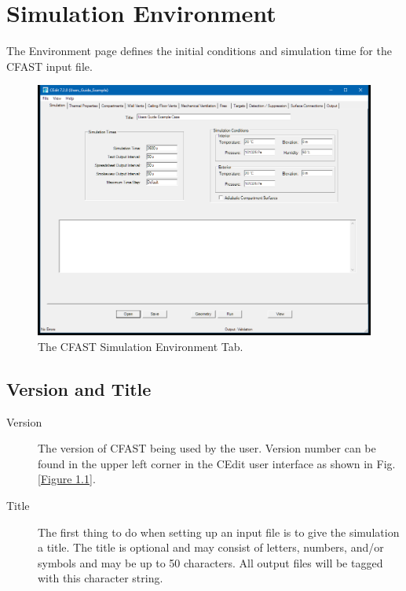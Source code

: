 \chapter{Simulation Environment}

The Environment page defines the initial conditions and simulation time for the CFAST input file.

\begin{figure}[ht]
\centering
\includegraphics[width=6.5in]{FIGURES/Environment_Tab}
\caption[The CFAST Simulation Environment Tab]{The CFAST Simulation Environment Tab.}
\end{figure}

\section{Version and Title}
\label{info:HEAD}

\begin{description}
\item[Version] The version of CFAST being used by the user. Version number can be found in the upper left corner in the CEdit user interface as shown in Fig. \ref{Figure 1.1}.

\item[Title] The first thing to do when setting up an input file is to give the simulation a title. The title is optional and may consist of letters, numbers, and/or symbols and may be up to 50 characters. All output files will be tagged with this character string.
\end{description}




